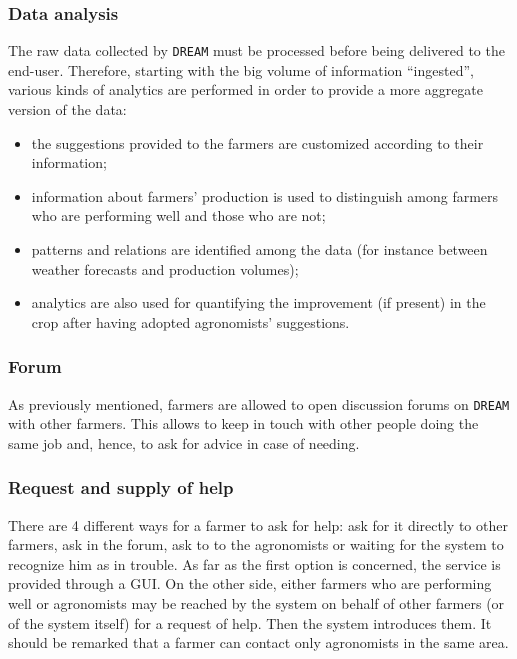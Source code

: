 \documentclass{article}
\begin{document}
\subsubsection{Data analysis}
The raw data collected by \verb|DREAM| must be processed before being delivered to the end-user. Therefore, 
starting with the big volume of information “ingested”, various kinds of analytics are performed in order to 
provide a more aggregate version of the data:
\begin{itemize}
\item the suggestions provided to the farmers are customized according to their information;
\item information about farmers’ production is used to distinguish among farmers who are performing well 
and those who are not;%
\item  patterns and relations are identified among the data (for instance between weather 
forecasts and production volumes);
\item analytics are also used for quantifying the improvement (if present) in the crop after having adopted agronomists’ suggestions.
\end{itemize}
\subsubsection{Forum}
As previously mentioned, farmers are allowed to open discussion forums on \verb|DREAM| with other farmers. 
This allows to keep in touch with other people doing the same job and, hence, to ask for advice in case of 
needing.
\subsubsection{Request and supply of help}
There are 4 different ways for a farmer to ask for help: ask for it directly to other farmers, ask in the forum, ask to to
the agronomists or waiting for the system to recognize him as in trouble. As far as the first option is 
concerned, the service is provided through a GUI. On the other side, either farmers who are performing 
well or agronomists may be reached by the system on behalf of other farmers (or of the system itself) for a 
request of help. Then the system introduces them. It should be remarked that a farmer can contact only 
agronomists in the same area.
\end{document}
